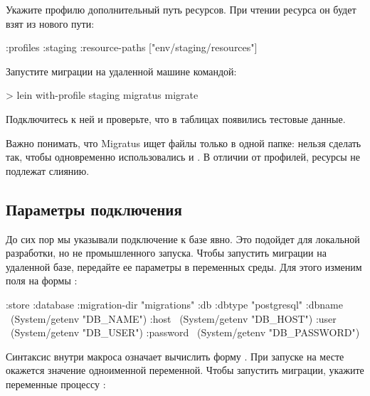 Укажите профилю  дополнительный путь ресурсов. При чтении ресурса  он будет взят из нового пути:

\begin{english}
  \begin{clojure}
{:profiles
 {:staging
  {:resource-paths
    ["env/staging/resources"]}}}
  \end{clojure}
\end{english}

Запустите миграции на удаленной машине командой:

\begin{english}
  \begin{bash}
> lein with-profile staging migratus migrate
  \end{bash}
\end{english}

Подключитесь к ней и проверьте, что в таблицах появились тестовые данные.

Важно понимать, что Migratus ищет файлы только в одной папке: нельзя сделать так, чтобы одновременно использовались  и . В отличии от профилей, ресурсы не подлежат слиянию.

\subsection{Параметры подключения}

До сих пор мы указывали подключение к базе явно. Это подойдет для локальной разработки, но не промышленного запуска. Чтобы запустить миграции на удаленной базе, передайте ее параметры в переменных среды. Для этого изменим поля  на формы :

\begin{english}
  \begin{clojure/lines}
{:store :database
 :migration-dir "migrations"
 :db {:dbtype "postgresql"
      :dbname ~(System/getenv "DB_NAME")
      :host ~(System/getenv "DB_HOST")
      :user ~(System/getenv "DB_USER")
      :password ~(System/getenv "DB_PASSWORD")}}
  \end{clojure/lines}
\end{english}

Синтаксис  внутри макроса  означает вычислить форму . При запуске  на месте  окажется значение одноименной переменной. Чтобы запустить миграции, укажите переменные процессу :

